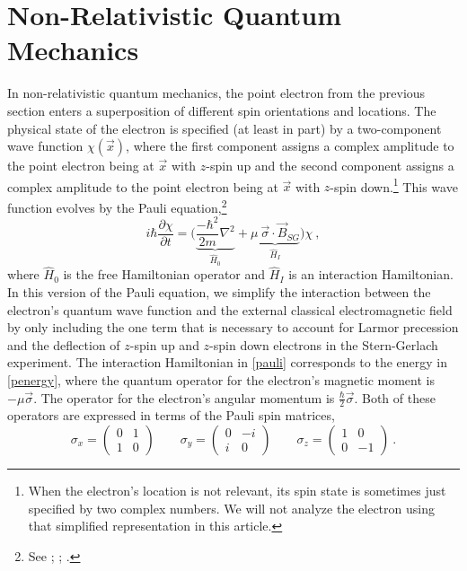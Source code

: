 \documentclass[12pt,secnumarabic,amsmath,amssymb,balancelastpage,nofootinbib]{article}
\begin{document}
\section{Non-Relativistic Quantum Mechanics}\label{nrqmsection}

In non-relativistic quantum mechanics, the point electron from the previous section enters a superposition of different spin orientations and locations.  The physical state of the electron is specified (at least in part) by a two-component wave function $\chi(\vec{x})$, where the first component assigns a complex amplitude to the point electron being at $\vec{x}$ with $z$-spin up and the second component assigns a complex amplitude to the point electron being at $\vec{x}$ with $z$-spin down.\footnote{When the electron's location is not relevant, its spin state is sometimes just specified by two complex numbers.  We will not analyze the electron using that simplified representation in this article.}  This wave function evolves by the Pauli equation,\footnote{See \citet[eq.\ 1.34]{bjorkendrell}; \citet[eq.\ 33.7]{lifshitzRQM}; \citet[eq.\ 1.28]{durr2020}.}
\begin{equation}
i \hbar \frac{\partial \chi}{\partial t} = \Big( \underbrace{\frac{- \hbar^2}{2 m}\nabla^2}_{\widehat{H}_0}+\underbrace{\mu\: \vec{\sigma} \cdot \vec{B}_{SG}}_{\widehat{H}_I} \Big)\chi
\ ,
\label{pauli}
\end{equation}
where $\widehat{H}_0$ is the free Hamiltonian operator and $\widehat{H}_I$ is an interaction Hamiltonian.  In this version of the Pauli equation, we simplify the interaction between the electron's quantum wave function and the external classical electromagnetic field by only including the one term that is necessary to account for Larmor precession and the deflection of $z$-spin up and $z$-spin down electrons in the Stern-Gerlach experiment.  The interaction Hamiltonian in \eqref{pauli} corresponds to the energy in \eqref{penergy}, where the quantum operator for the electron's magnetic moment is $-\mu \vec{\sigma}$.  The operator for the electron's angular momentum is $\frac{\hbar}{2}\vec{\sigma}$.  Both of these operators are expressed in terms of the Pauli spin matrices,
\begin{equation}
\sigma_x=\left(\begin{matrix} 0 & 1 \\  1 & 0 \end{matrix}\right)
\quad\quad
\sigma_y=\left(\begin{matrix} 0 & -i \\  i & 0 \end{matrix}\right)
\quad\quad
\sigma_z=\left(\begin{matrix} 1 & 0 \\ 0 & -1 \end{matrix}\right)
\ .
\label{matrixdefs}
\end{equation}
\end{document}
